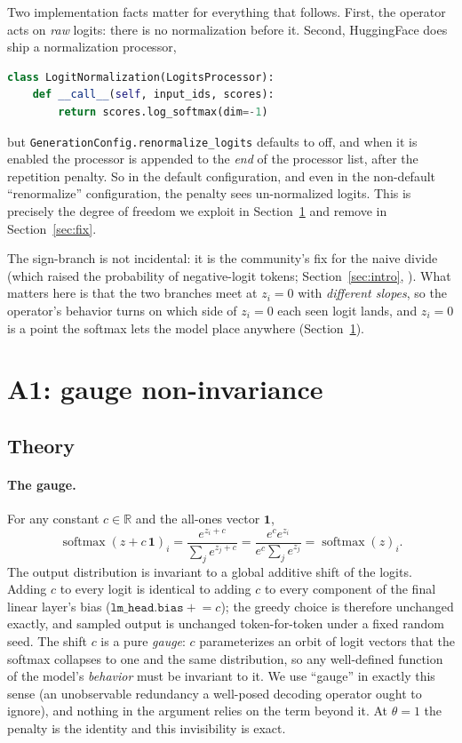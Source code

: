 \documentclass[11pt]{article}
\newcommand{\thp}{\theta}
\newcommand{\softmax}{\operatorname{softmax}}
\newcommand{\code}[1]{\texttt{#1}}
\begin{document}
Two implementation facts matter for everything that follows. First, the operator acts on
\emph{raw} logits: there is no normalization before it. Second, HuggingFace does ship a
normalization processor,
\begin{lstlisting}[language=Python]
class LogitNormalization(LogitsProcessor):
    def __call__(self, input_ids, scores):
        return scores.log_softmax(dim=-1)
\end{lstlisting}
but \code{GenerationConfig.renormalize\_logits} defaults to off, and when it is enabled the
processor is appended to the \emph{end} of the processor list, after the repetition
penalty. So in the default configuration, and even in the non-default ``renormalize''
configuration, the penalty sees un-normalized logits. This is precisely the degree of
freedom we exploit in Section~\ref{sec:a1} and remove in Section~\ref{sec:fix}.

The sign-branch is not incidental: it is the community's fix for the naive divide (which raised
the probability of negative-logit tokens; Section~\ref{sec:intro}, \citealp{hf2302}). What
matters here is that the two branches meet at $z_i=0$ with \emph{different slopes}, so the
operator's behavior turns on which side of $z_i=0$ each seen logit lands, and $z_i=0$ is a point
the softmax lets the model place anywhere (Section~\ref{sec:a1}).

\section{A1: gauge non-invariance}
\label{sec:a1}

\subsection{Theory}
\label{sec:a1-theory}

\paragraph{The gauge.} For any constant $c \in \mathbb{R}$ and the all-ones vector
$\mathbf{1}$,
\begin{equation}
\label{eq:shiftinv}
\softmax(z + c\,\mathbf{1})_i
= \frac{e^{z_i + c}}{\sum_j e^{z_j + c}}
= \frac{e^{c} e^{z_i}}{e^{c}\sum_j e^{z_j}}
= \softmax(z)_i .
\end{equation}
The output distribution is invariant to a global additive shift of the logits. Adding $c$
to every logit is identical to adding $c$ to every component of the final linear layer's
bias ($\code{lm\_head.bias} \mathrel{+}= c$); the greedy choice is therefore unchanged
exactly, and sampled output is unchanged token-for-token under a fixed random
seed. The shift $c$ is a pure \emph{gauge}: $c$ parameterizes an orbit of logit
vectors that the softmax collapses to one and the same distribution, so any well-defined
function of the model's \emph{behavior} must be invariant to it. We use ``gauge'' in exactly
this sense (an unobservable redundancy a well-posed decoding operator ought to ignore), and
nothing in the argument relies on the term beyond it. At $\thp=1$ the penalty is the identity
and this invisibility is exact.
\end{document}
